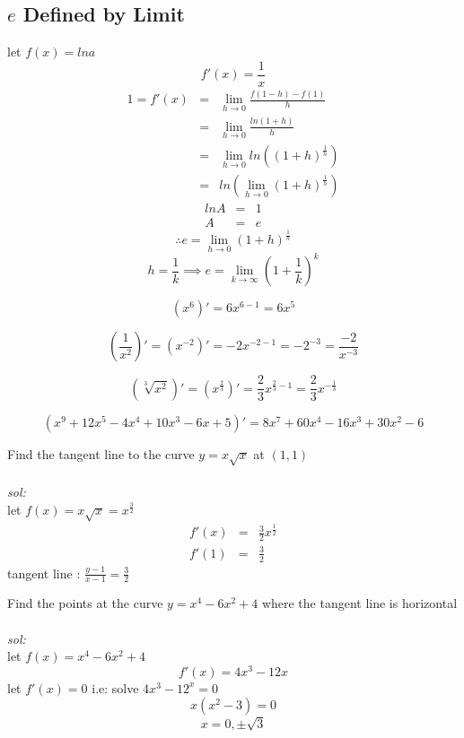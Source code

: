 \subsection*{$e$ Defined by Limit}
let $\displaystyle f(x) = lna$\\
$$f'(x) = \frac{1}{x}$$
$$\begin{array}{rcl}
\displaystyle 1 = f'(x) & = & \displaystyle \lim_{h \to 0} \frac{f(1-h) - f(1)}{h}\\
& = & \displaystyle \lim_{h \to 0} \frac{ln (1+h)}{h}\\
& = & \displaystyle \lim_{h \to 0} ln((1+h)^{\frac{1}{h}})\\
& = & \displaystyle ln(\lim_{h \to 0} (1+h)^\frac{1}{h})
\end{array}$$
$$\begin{array}{rcl}
ln A & = & 1\\
A & = & e
\end{array}$$
$$\therefore \displaystyle e = \lim_{h \to 0} (1+h)^{\frac{1}{h}}$$
$$\displaystyle h = \frac{1}{k} \implies e = \lim_{k \to \infty} (1 + \frac{1}{k})^k$$
\begin{eg}
$$\displaystyle (x^6)' = 6x^{6-1} = 6x^5$$
\end{eg}
\begin{eg}
$$\displaystyle (\frac{1}{x^2})' = (x^{-2})' = -2x^{-2-1} = -2^{-3} = \frac{-2}{x^{-3}}$$
\end{eg}
\begin{eg}
$$\displaystyle (\sqrt[3]{x^2})' = (x^{\frac{2}{3}})' = \frac{2}{3} x^{\frac{2}{3} - 1} = \frac{2}{3} x^{-\frac{1}{3}}$$
\end{eg}
\begin{eg}
$$(x^9 + 12x^5 - 4x^4 + 10x^3 - 6x+5)' = 8x^7 + 60 x^4 - 16x^3 + 30x^2- 6$$
\end{eg}
\begin{eg}
Find the tangent line to the curve $y = x\sqrt{x}$ at $(1,1)$\\\\
\textit{sol:}\\
let $\displaystyle f(x) = x\sqrt{x} = x^{\frac{3}{2}}$
$$\begin{array}{rcl}
f'(x) & = & \displaystyle \frac{3}{2} x^{\frac{1}{2}}\\
f'(1) & = & \displaystyle \frac{3}{2}
\end{array}$$
tangent line : $\displaystyle \frac{y-1}{x-1} = \frac{3}{2}$
\end{eg}
\begin{eg}
Find the points at the curve $y = x^4 -6x^2 + 4$ where the tangent line is horizontal\\\\
\textit{sol:}\\
let $\displaystyle f(x) = x^4-6x^2 + 4$
$$\displaystyle f'(x) = 4x^3 -12x$$
let $f'(x) = 0$ \quad i.e: solve $4x^3 -12^x=0$
$$\displaystyle x(x^2-3)=0$$ 
$$x=0, \pm\sqrt{3}$$
\end{eg}

